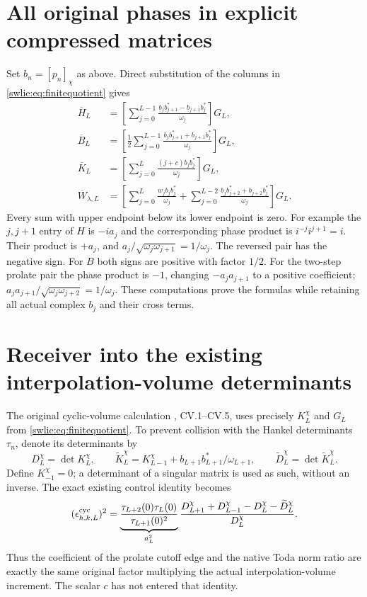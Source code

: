 \section{All original phases in explicit compressed matrices}

Set $b_n=[p_n]_\chi$ as above. Direct substitution of
the columns in \eqref{swlie:eq:finitequotient} gives
\begin{equation}\label{swlie:eq:explicitcompressed}
 \begin{aligned}
 \overline H_L
 &=\left[\sum_{j=0}^{L-1}
       \frac{b_jb_{j+1}^*-b_{j+1}b_j^*}{\omega_j}\right]G_L,\\
 \overline B_L
 &=\left[\frac12\sum_{j=0}^{L-1}
       \frac{b_jb_{j+1}^*+b_{j+1}b_j^*}{\omega_j}\right]G_L,\\
 \overline K_L
 &=\left[\sum_{j=0}^L
                  \frac{(j+c)b_jb_j^*}{\omega_j}\right]G_L,\\
 \overline W_{\lambda,L}
 &=\left[\sum_{j=0}^L\frac{w_jb_jb_j^*}{\omega_j}
      +\sum_{j=0}^{L-2}
             \frac{b_jb_{j+2}^*+b_{j+2}b_j^*}{\omega_j}\right]G_L.
 \end{aligned}
\end{equation}
Every sum with upper endpoint below its lower endpoint
is zero. For example the $j,j+1$ entry of $H$ is
$-ia_j$ and the corresponding phase product is
$i^{-j}i^{j+1}=i$. Their product is $+a_j$,
and $a_j/\sqrt{\omega_j\omega_{j+1}}=1/\omega_j$.
The reversed pair has the negative sign. For $B$
both signs are positive with factor $1/2$.
For the two-step prolate pair the phase product is
$-1$, changing $-a_ja_{j+1}$ to a positive coefficient;
$a_ja_{j+1}/\sqrt{\omega_j\omega_{j+2}}=1/\omega_j$.
These computations prove the formulas while retaining
all actual complex $b_j$ and their cross terms.

\section{Receiver into the existing interpolation-volume determinants}

The original cyclic-volume calculation \cite{swlie:CV}, CV.1--CV.5,
uses precisely $K_L^\chi$ and $G_L$ from
\eqref{swlie:eq:finitequotient}. To prevent collision with the
Hankel determinants $\tau_n$, denote its determinants by
\[
 D_L^\chi=\det K_L^\chi,\qquad
 \widetilde K_L^\chi=K_{L-1}^\chi
                     +b_{L+1}b_{L+1}^*/\omega_{L+1},
 \qquad \widetilde D_L^\chi=\det\widetilde K_L^\chi.
\]
Define $K_{-1}^\chi=0$; a determinant of a singular
matrix is used as such, without an inverse.
The exact existing control identity becomes
\begin{equation}\label{swlie:eq:CVreceiver}
 (\epsilon_{h,k,L}^{\rm cyc})^2
 =\underbrace{\frac{\tau_{L+2}(0)\tau_L(0)}
                         {\tau_{L+1}(0)^2}}_{a_L^2}
   \frac{D_{L+1}^\chi+D_{L-1}^\chi
                    -D_L^\chi-\widetilde D_L^\chi}{D_L^\chi}.
\end{equation}
Thus the coefficient of the prolate cutoff edge and
the native Toda norm ratio are exactly the same original
factor multiplying the actual interpolation-volume
increment. The scalar $c$ has not entered that identity.

